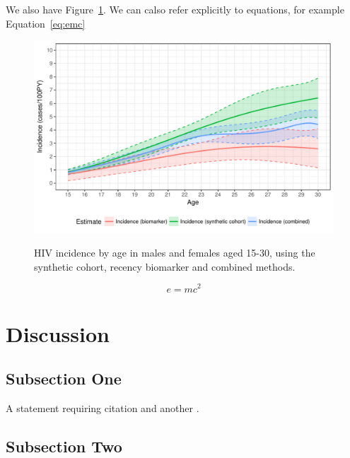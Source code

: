 \documentclass[a4paper,12pt,british]{article} %
\begin{document}
\blindtext

We also have Figure~\ref{figure1}. We can calso refer explicitly to equations, for example Equation~\ref{eq:emc}

\begin{figure}[!h] %
\caption{HIV incidence by age in males and females aged 15-30, using the synthetic cohort, recency biomarker and combined methods.}
\includegraphics[width = 1\textwidth]{Figure1.pdf}
\label{figure1}
\end{figure}

\blindtext %

\begin{equation}
\label{eq:emc}
e = mc^2
\end{equation}

\blindtext %


\section{Discussion}

\subsection{Subsection One}

A statement requiring citation \cite{Schlegel2016} and another \cite{Williams2001}.

\blindtext %

\subsection{Subsection Two}

\blindtext %








\end{document}
